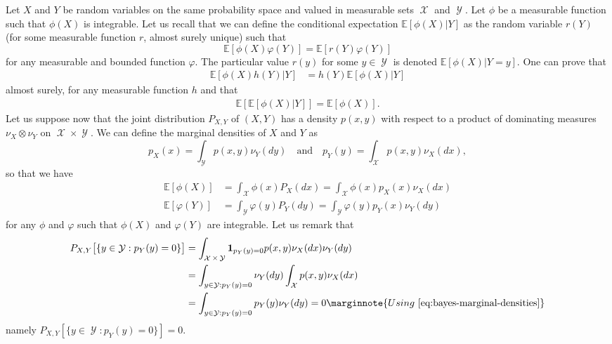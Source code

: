 \documentclass[
	fontsize=11pt, %
	twoside=false, %
	numbers=noenddot, %
]{kaobook}
\DeclareMathOperator{\cX}{{\mathcal X}}
\DeclareMathOperator{\cY}{{\mathcal Y}}
\newcommand{\E}{\mathbb E}
\newcommand{\ind}[1]{\mathbf 1_{#1}}
\begin{document}
Let $X$ and $Y$ be random variables on the same probability space and valued in measurable sets $\cX$ and $\cY$.
Let $\phi$ be a measurable function such that $\phi(X)$ is integrable. 
Let us recall that we can define the conditional expectation $\E [\phi(X) | Y]$ as the random variable $r(Y)$ (for some measurable function $r$, almost surely unique) such that
\begin{equation}
	\E[\phi(X) \varphi(Y)] = \E[ r(Y) \varphi(Y)]
\end{equation}
for any measurable and bounded function $\varphi$.
The particular value $r(y)$ for some $y \in \cY$ is denoted $\E[\phi(X) | Y = y]$. 
One can prove that
\begin{align*}
	\E[\phi(X) h(Y) | Y] &= h(Y) \E[ \phi(X) | Y]
\end{align*}
almost surely, for any measurable function $h$ and that
\begin{align}
	\E [\E[ \phi(X) | Y]] = \E[\phi(X)].
\end{align}
Let us suppose now that the joint distribution $P_{X, Y}$ of $(X, Y)$ has a density $p(x, y)$ with respect to a product of dominating measures $\nu_X \otimes \nu_Y$ on $\cX \times \cY$.
We can define the marginal densities of $X$ and $Y$ as
\begin{equation}
	\label{eq:bayes-marginal-densities}
	p_X(x) = \int_{\cY} p(x, y) \nu_Y(d y) \quad \text{and} \quad
	p_Y(y) = \int_{\cX} p(x, y) \nu_X(d x),
\end{equation}
so that we have
\begin{align*}
	\E[\phi(X)] &= \int_{\cX} \phi(x) P_X(dx) = \int_{\cX} \phi(x) p_X(x) \nu_X(dx) \\ 
	\E[\varphi(Y)] &= \int_{\cY} \varphi(y) P_Y(dy) = \int_{\cY} \varphi(y) p_Y(x) \nu_Y(dy)
\end{align*}
for any $\phi$ and $\varphi$ such that $\phi(X)$ and $\varphi(Y)$ are integrable. 
Let us remark that
\begin{align*}
	P_{X, Y} \big[ \{ y \in \cY : p_Y(y) = 0 \} \big] 
	&= \int_{\cX \times \cY} \ind{p_Y(y) = 0} p(x, y) \nu_X(dx) \nu_Y(dy) \\
	&= \int_{y \in \cY : p_Y(y) = 0} \nu_Y(dy) \int_{\cX} p(x, y) \nu_X (dx) \\
	&= \int_{y \in \cY : p_Y(y) = 0} p_Y(y) \nu_Y(dy) = 0
	\marginnote{Using~\eqref{eq:bayes-marginal-densities}}
\end{align*}
namely $P_{X, Y}[ \{ y \in \cY : p_Y(y) = 0 \}] = 0$.
\end{document}
